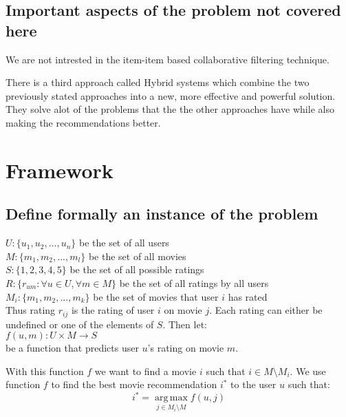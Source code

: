 \documentclass[a4paper,11pt]{article}
\begin{document}
\subsection{Important aspects of the problem not covered here}
We are not intrested in the item-item based collaborative filtering technique.

There is a third approach called Hybrid systems which combine the two previously stated approaches into a new,
more effective and powerful solution. They solve alot of the problems that the the other approaches have while
also making the recommendations better.

\section{Framework}
\subsection{Define formally an instance of the problem}
$U : \{u_1, u_2, ..., u_n\}$ be the set of all users\\
$M : \{m_1, m_2, ..., m_l\}$ be the set of all movies\\
$S : \{1,2,3,4,5\}$ be the set of all possible ratings \\
$R : \{r_{um} : \forall u \in U, \forall m \in M\}$ be the set of all ratings by all users\\
$M_i : \{m_1, m_2, ..., m_k\}$ be the set of movies that user $i$ has rated \\

Thus rating $r_{ij}$ is the rating of user $i$ on movie $j$. Each rating can either be undefined
or one of the elements of $S$. Then let: \\

$f(u,m) : U \times M \to S$ \\

be a function that predicts user $u$'s rating on movie $m$.

With this function $f$ we want to find a movie $i$ such that $i \in M \setminus M_i$.
We use function $f$ to find the best movie recommendation $i^{*}$ to
the user $u$ such that: \\
\[ i^{*} = \operatorname*{arg\,max}_{j \in M_i \setminus M} f(u,j) \]
\end{document}
